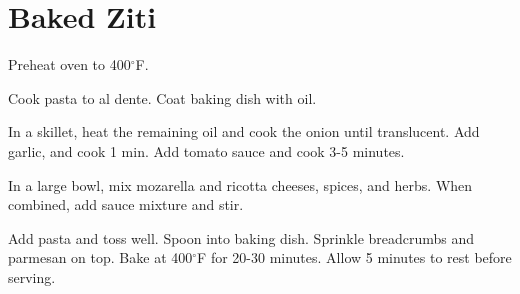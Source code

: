 \section{Baked Ziti}
\begin{recipe}
	
	
	
	Preheat oven to 400$^{\circ}$F. 
	
	Cook pasta to al dente. Coat baking dish with oil.
	

	In a skillet, heat the remaining oil and cook the onion until translucent. Add garlic, and cook 1 min. Add tomato sauce and cook 3-5 minutes.
	
	In a large bowl, mix mozarella and ricotta cheeses, spices, and herbs. When combined, add sauce mixture and stir.
	
	Add pasta and toss well. Spoon into baking dish. Sprinkle breadcrumbs and parmesan on top. Bake at 400$^{\circ}$F for 20-30 minutes. Allow 5 minutes to rest before serving.
	
\end{recipe}

